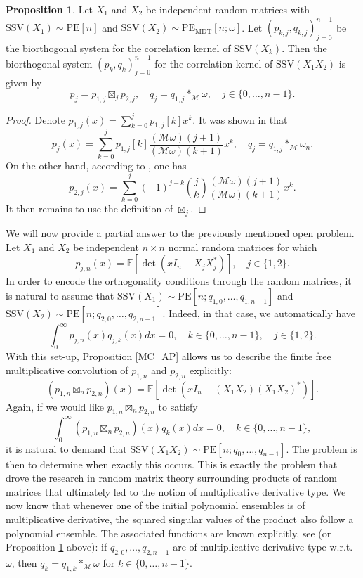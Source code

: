 \documentclass[a4paper,12pt,oneside]{article}
\theoremstyle{definition}
\newtheorem{prop}[defi]{Proposition}
\newcommand{\om}{\omega}
\newcommand{\MT}[1]{\mathcal{M}#1}
\begin{document}
\begin{prop} \label{MC_BS}
Let $X_1$ and $X_2$ be independent random matrices with $\text{SSV}(X_1)\sim\text{PE}[n]$ and $\text{SSV}(X_2)\sim\text{PE}_{\text{MDT}}[n;\om]$. Let $(p_{k,j},q_{k,j})_{j=0}^{n-1}$ be the biorthogonal system for the correlation kernel of $\text{SSV}(X_k)$. Then the biorthogonal system $(p_k,q_k)_{j=0}^{n-1}$ for the correlation kernel of $\text{SSV}(X_1X_2)$ is given by
    $$ p_j = p_{1,j} \boxtimes_{j} p_{2,j},\quad q_j = q_{1,j} \ast_{\MT{}} \om,\quad j\in\{0,\dots,n-1\}. $$
\end{prop}
\begin{proof}
Denote $p_{1,j}(x) = \sum_{k=0}^{j} p_{1,j}[k] x^k$. It was shown in \cite[Cor. 3.7]{KK:mult_conv} that 
$$ p_j(x) = \sum_{k=0}^j p_{1,j}[k] \frac{(\mathcal{M}\om)(j+1)}{(\mathcal{M}\om)(k+1)} x^k ,\quad q_{j} = q_{1,j} \ast_{\MT{}} \om_n. $$
On the other hand, according to \cite[Lem. 4.2]{KK:SV_EV}, one has
$$ p_{2,j}(x) = \sum_{k=0}^j (-1)^{j-k} \binom{j}{k} \frac{(\mathcal{M}\om)(j+1)}{(\mathcal{M}\om)(k+1)} x^k. $$
It then remains to use the definition of $\boxtimes_{j}$.
\end{proof}


We will now provide a partial answer to the previously mentioned open problem. Let $X_1$ and $X_2$ be independent $n\times n$ normal random matrices for which 
    $$ p_{j,n}(x) = \mathbb{E}[\det(xI_n-X_jX_j^\ast)],\quad j\in\{1,2\}. $$
In order to encode the orthogonality conditions through the random matrices, it is natural to assume that $\text{SSV}(X_1)\sim \text{PE}[n;q_{1,0},\dots,q_{1,n-1}]$ and $\text{SSV}(X_2)\sim \text{PE}[n;q_{2,0},\dots,q_{2,n-1}]$. Indeed, in that case, we automatically have
    $$\int_0^\infty p_{j,n}(x) q_{j,k}(x) dx = 0,\quad k\in\{0,\dots,n-1\},\quad j\in\{1,2\}.$$
With this set-up, Proposition \ref{MC_AP} allows us to describe the finite free multiplicative convolution of $p_{1,n}$ and $p_{2,n}$ explicitly:
    $$ (p_{1,n}\boxtimes_n p_{2,n})(x) = \mathbb{E}[\det(xI_n-(X_1X_2)(X_1X_2)^\ast)].  $$
Again, if we would like $p_{1,n}\boxtimes_n p_{2,n}$ to satisfy 
    $$\int_0^\infty (p_{1,n}\boxtimes_n p_{2,n})(x) q_k(x) dx = 0,\quad k\in\{0,\dots,n-1\},$$
it is natural to demand that $\text{SSV}(X_1X_2)\sim \text{PE}[n;q_0,\dots,q_{n-1}]$. The problem is then to determine when exactly this occurs. This is exactly the problem that drove the research in random matrix theory surrounding products of random matrices that ultimately led to the notion of multiplicative derivative type. We now know that whenever one of the initial polynomial ensembles is of multiplicative derivative, the squared singular values of the product also follow a polynomial ensemble. The associated functions are known explicitly, see \cite[Cor. 3.7]{KK:mult_conv} (or Proposition \ref{MC_BS} above): if $q_{2,0},\dots,q_{2,n-1}$ are of multiplicative derivative type w.r.t. $\omega$, then $q_k = q_{1,k} \ast_{\MT{}} \om$ for $k\in\{0,\dots,n-1\}$. 
\medbreak
\end{document}
